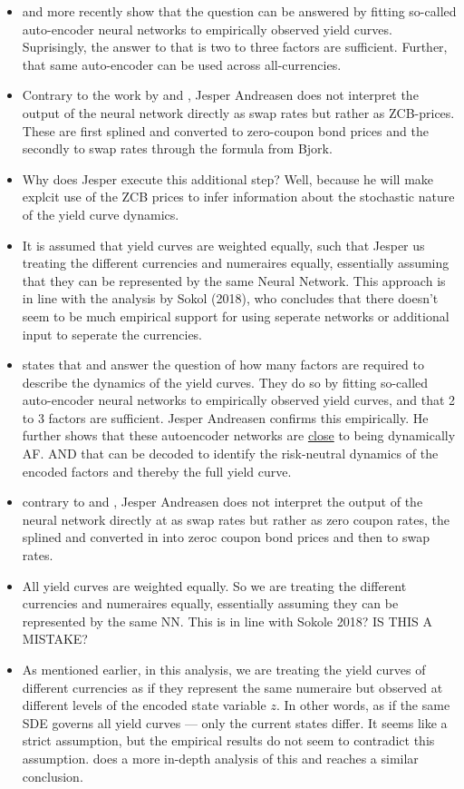 \begin{itemize}
    \item \cite{Kondratyev2018} and more recently \cite{Sokol2022} show that the question can be answered by fitting so-called auto-encoder neural networks to empirically observed yield curves. Suprisingly, the answer to that is two to three factors are sufficient. Further, that same auto-encoder can be used across all-currencies. 
    \item Contrary to the work by \cite{Kondratyev2018} and \cite{Sokol2022} , Jesper Andreasen does not interpret the output of the neural network directly as swap rates but rather as ZCB-prices. These are first splined and converted to zero-coupon bond prices and the secondly to swap rates through the formula from Bjork.
    \item Why does Jesper execute this additional step? Well, because he will make explcit use of the ZCB prices to infer information about the stochastic nature of the yield curve dynamics.
    \item It is assumed that yield curves are weighted equally, such that Jesper us treating the different currencies and numeraires equally, essentially assuming that they can be represented by the same Neural Network. This approach is in line with the analysis by Sokol (2018), who concludes that there doesn't seem to be much empirical support for using seperate networks or additional input to seperate the currencies.
    \item states that \cite{Kondratyev2018} and \cite{Sokol2022} answer the question of how many factors are required to describe the dynamics of the yield curves. They do so by fitting so-called auto-encoder neural networks to empirically observed yield curves, and that 2 to 3 factors are sufficient. Jesper Andreasen confirms this empirically. He further shows that these autoencoder networks are \underline{close} to being dynamically AF. AND that can be decoded to identify the risk-neutral dynamics of the encoded factors and thereby the full yield curve.
    \item contrary to \cite{Kondratyev2018} and \cite{Sokol2022}, Jesper Andreasen does not interpret the output of the neural network directly at as swap rates but rather as zero coupon rates, the splined and converted in into zeroc coupon bond prices and then to swap rates.
    \item All yield curves are weighted equally. So we are treating the different currencies and numeraires equally, essentially assuming they can be represented by the same NN. This is in line with Sokole 2018? IS THIS A  MISTAKE?
    \item As mentioned earlier, in this analysis, we are treating the yield curves of different currencies as if they represent the same numeraire but observed at
    different levels of the encoded state variable $z$. In other words, as if the same SDE governs all yield curves --- only the current states differ. It seems
    like a strict assumption, but the empirical results do not seem to contradict this assumption. \citet{Sokol2022} does a more in-depth analysis of this and reaches a similar conclusion.
\end{itemize}


